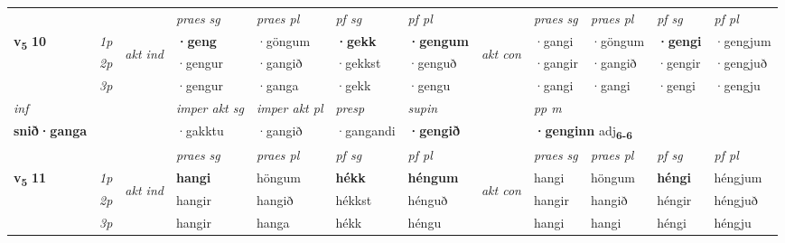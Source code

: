 \begin{longtable}[l]{X>{\footnotesize\itshape}llXXXXlXXXX}
\midrule

 & &   & \textit{praes sg}  & \textit{praes pl}    & \textit{ pf sg} & \textit{pf pl} & & \textit{praes sg}  & \textit{praes pl}    & \textit{pf sg} & \textit{pf pl }  \\ \cmidrule{4-7} \cmidrule{9-12}
 \multirow{2}{*}{{{\textbf{v{\textsubscript{5}}} \Large{\textbf{10}}}}}  & 1p & \multirow{3}{*}{\begin{turn}{90}\textit{akt ind}\end{turn}} & \textbf{·geng} & ·göngum & \textbf{·gekk} & \textbf{·gengum} & \multirow{3}{*}{\begin{turn}{90}\textit{akt con}\end{turn}} &·gangi & ·göngum & \textbf{·gengi} & ·gengjum\\*
 & 2p &  &  ·gengur  & ·gangið & ·gekkst & ·genguð & & ·gangir & ·gangið & ·gengir & ·gengjuð \\*
 & 3p &  & ·gengur & ·ganga & ·gekk & ·gengu & & ·gangi & ·gangi& ·gengi & ·gengju \\*
\cmidrule{4-7} \cmidrule{9-12}

   {\textit{inf}} & &  & \textit{imper akt sg} & \textit{imper akt pl}   & \textit{presp} & \textit{supin}  && \textit{pp m} \\*
  {\textbf{snið\allowbreak ·ganga}} & && ·gakktu  & ·gangið   & ·gangandi &  \textbf{·gengið}  && \multicolumn{2}{l}{\textbf{·genginn} adj\textbf{\textsubscript{6-6}}} \\*

\midrule

 & &   & \textit{praes sg}  & \textit{praes pl}    & \textit{ pf sg} & \textit{pf pl} & & \textit{praes sg}  & \textit{praes pl}    & \textit{pf sg} & \textit{pf pl }  \\ \cmidrule{4-7} \cmidrule{9-12}
 \multirow{2}{*}{{{\textbf{v{\textsubscript{5}}} \Large{\textbf{11}}}}}  & 1p & \multirow{3}{*}{\begin{turn}{90}\textit{akt ind}\end{turn}} & \textbf{hangi} & höngum & \textbf{hékk} & \textbf{héngum} & \multirow{3}{*}{\begin{turn}{90}\textit{akt con}\end{turn}} &hangi & höngum & \textbf{héngi} & héngjum\\*
 & 2p &  &  hangir  & hangið & hékkst & hénguð & & hangir & hangið & héngir & héngjuð \\*
 & 3p &  & hangir & hanga & hékk & héngu & & hangi & hangi& héngi & héngju \\*
\cmidrule{4-7} \cmidrule{9-12}


\end{longtable}
